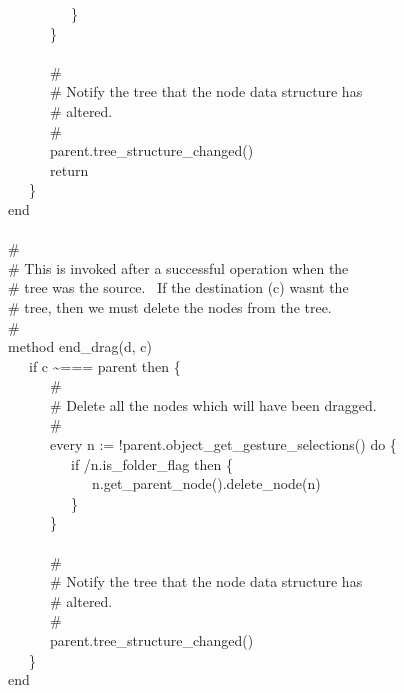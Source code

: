 {\>   \ \ \ \ \ \ \ \ \ \} \\
\>   \ \ \ \ \ \ \} \\
\ \\
\>   \ \ \ \ \ \ \# \\
\>   \ \ \ \ \ \ \# Notify the tree that the node data structure has  \\
\>   \ \ \ \ \ \ \# altered. \\
\>   \ \ \ \ \ \ \# \\
\>   \ \ \ \ \ \ parent.tree\_structure\_changed() \\
\>   \ \ \ \ \ \ return \\
\>   \ \ \ \} \\
\>   end \\
\ \\
\>   \# \\
\>   \# This is invoked after a successful operation when the \\
\>   \# tree was the source. \ If the destination (c)
wasn{\textquotesingle}t the \\
\>   \# tree, then we must delete the nodes from the tree. \\
\>   \# \\
\>   method end\_drag(d, c) \\
\>   \ \ \ if c \~{}=== parent then \{ \\
\>   \ \ \ \ \ \ \# \\
\>   \ \ \ \ \ \ \# Delete all the nodes which will have been dragged. \\
\>   \ \ \ \ \ \ \# \\
\>   \ \ \ \ \ \ every n := !parent.object\_get\_gesture\_selections()
do \{ \\
\>   \ \ \ \ \ \ \ \ \ if /n.is\_folder\_flag then \{ \\
\>   \ \ \ \ \ \ \ \ \ \ \ \ n.get\_parent\_node().delete\_node(n) \\
\>   \ \ \ \ \ \ \ \ \ \} \\
\>   \ \ \ \ \ \ \} \\
\ \\
\>   \ \ \ \ \ \ \# \\
\>   \ \ \ \ \ \ \# Notify the tree that the node data structure has \\
\>   \ \ \ \ \ \ \# altered. \\
\>   \ \ \ \ \ \ \# \\
\>   \ \ \ \ \ \ parent.tree\_structure\_changed() \\
\>   \ \ \ \} \\
\>   end \\
}
